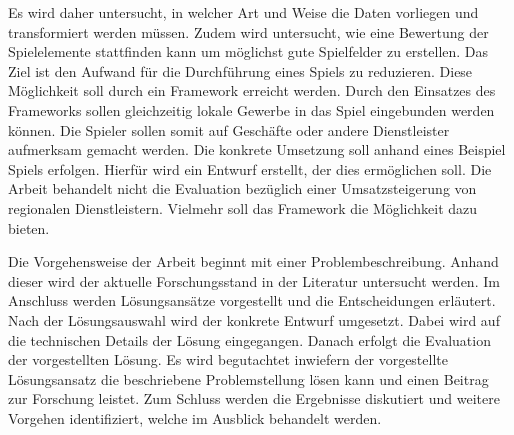 Es wird daher untersucht, in welcher Art und Weise die Daten vorliegen und transformiert werden müssen.
Zudem wird untersucht, wie eine Bewertung der Spielelemente stattfinden kann um möglichst gute Spielfelder zu erstellen.
Das Ziel ist den Aufwand für die Durchführung eines Spiels zu reduzieren. Diese Möglichkeit soll durch ein Framework erreicht werden. Durch den Einsatzes des Frameworks sollen gleichzeitig lokale Gewerbe in das Spiel eingebunden werden können. Die Spieler sollen somit auf Geschäfte oder andere Dienstleister aufmerksam gemacht werden.
Die konkrete Umsetzung soll anhand eines Beispiel Spiels erfolgen.
Hierfür wird ein Entwurf erstellt, der dies ermöglichen soll.
Die Arbeit behandelt nicht die Evaluation bezüglich einer Umsatzsteigerung von regionalen Dienstleistern. Vielmehr soll das Framework die Möglichkeit dazu bieten.

Die Vorgehensweise der Arbeit beginnt mit einer Problembeschreibung. Anhand dieser wird der aktuelle Forschungsstand in der Literatur untersucht werden.
Im Anschluss werden Lösungsansätze vorgestellt und die Entscheidungen erläutert. Nach der Lösungsauswahl wird der konkrete Entwurf umgesetzt.
Dabei wird auf die technischen Details der Lösung eingegangen. Danach erfolgt die Evaluation der vorgestellten Lösung.
Es wird begutachtet inwiefern der vorgestellte Lösungsansatz die beschriebene Problemstellung lösen kann und einen Beitrag zur Forschung leistet.
Zum Schluss werden die Ergebnisse diskutiert und weitere Vorgehen identifiziert, welche im Ausblick behandelt werden.

